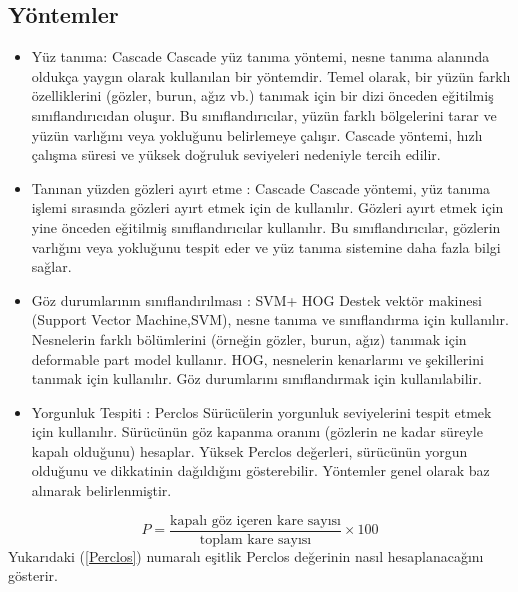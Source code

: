 \documentclass[12pt, a4paper]{article}
\begin{document}
 \subsection{Yöntemler}
 \begin{itemize}
 	
 	\item Yüz tanıma: Cascade \newline
 	Cascade yüz tanıma yöntemi, nesne tanıma alanında oldukça yaygın olarak kullanılan bir yöntemdir.
 	Temel olarak, bir yüzün farklı özelliklerini (gözler, burun, ağız vb.) tanımak için bir dizi önceden eğitilmiş sınıflandırıcıdan oluşur.
 	Bu sınıflandırıcılar, yüzün farklı bölgelerini tarar ve yüzün varlığını veya yokluğunu belirlemeye çalışır.
 	Cascade yöntemi, hızlı çalışma süresi ve yüksek doğruluk seviyeleri nedeniyle tercih edilir.
 	\item Tanınan yüzden gözleri ayırt etme : Cascade  \newline
 	Cascade yöntemi, yüz tanıma işlemi sırasında gözleri ayırt etmek için de kullanılır.
 	Gözleri ayırt etmek için yine önceden eğitilmiş sınıflandırıcılar kullanılır.
 	Bu sınıflandırıcılar, gözlerin varlığını veya yokluğunu tespit eder ve yüz tanıma sistemine daha fazla bilgi sağlar.
 	\item Göz durumlarının sınıflandırılması : SVM+ HOG  \newline
 	Destek vektör makinesi (Support Vector Machine,SVM), nesne tanıma ve sınıflandırma için kullanılır. Nesnelerin farklı bölümlerini (örneğin gözler, burun, ağız) tanımak için deformable part model kullanır.
 	HOG, nesnelerin kenarlarını ve şekillerini tanımak için kullanılır. Göz durumlarını sınıflandırmak için kullanılabilir.
 	\item Yorgunluk Tespiti : Perclos
 	Sürücülerin yorgunluk seviyelerini tespit etmek için kullanılır.
 	Sürücünün göz kapanma oranını (gözlerin ne kadar süreyle kapalı olduğunu) hesaplar.
 	Yüksek Perclos değerleri, sürücünün yorgun olduğunu ve dikkatinin dağıldığını gösterebilir. Yöntemler genel olarak \cite{ieeedata} baz alınarak belirlenmiştir.
 \end{itemize}
 	\begin{equation}\label{Perclos}
 		P = \frac{\text{kapalı göz içeren kare sayısı}}{\text{toplam kare sayısı}} \times 100
 	\end{equation}
 	Yukarıdaki (\ref{Perclos}) numaralı eşitlik Perclos değerinin nasıl hesaplanacağını gösterir.
\end{document}
